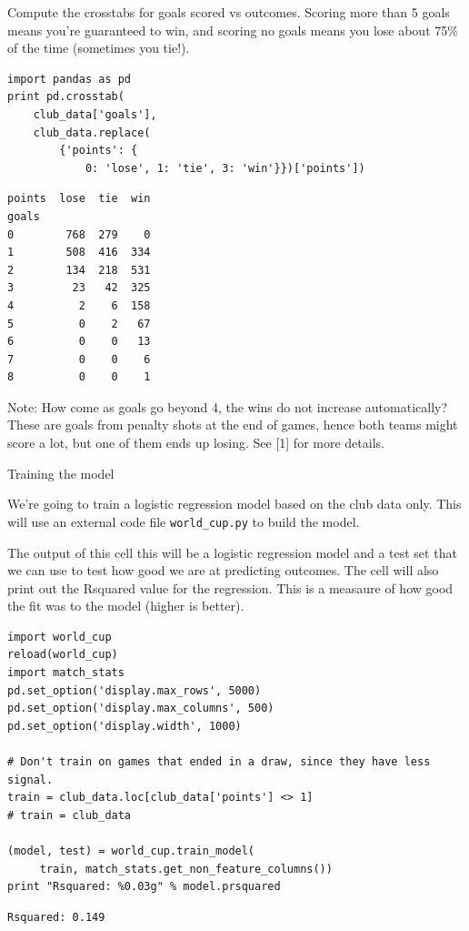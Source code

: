 \documentclass[12pt,fleqn]{article}\usepackage{common}
\begin{document}
Compute the crosstabs for goals scored vs outcomes. Scoring more than 5
goals means you're guaranteed to win, and scoring no goals means you lose
about 75\% of the time (sometimes you tie!).

\begin{verbatim}
import pandas as pd
print pd.crosstab(
    club_data['goals'], 
    club_data.replace(
        {'points': {
            0: 'lose', 1: 'tie', 3: 'win'}})['points'])
\end{verbatim}

\begin{verbatim}
points  lose  tie  win
goals                 
0        768  279    0
1        508  416  334
2        134  218  531
3         23   42  325
4          2    6  158
5          0    2   67
6          0    0   13
7          0    0    6
8          0    0    1
\end{verbatim}

Note: How come as goals go beyond 4, the wins do not increase
automatically? These are goals from penalty shots at the end of games,
hence both teams might score a lot, but one of them ends up losing. See [1]
for more details.

Training the model

We're going to train a logistic regression model based on the club data
only. This will use an external code file \verb!world_cup.py! to build the
model.

The output of this cell this will be a logistic regression model and a test
set that we can use to test how good we are at predicting outcomes. The
cell will also print out the Rsquared value for the regression. This is a
measaure of how good the fit was to the model (higher is better).

\begin{verbatim}
import world_cup
reload(world_cup)
import match_stats
pd.set_option('display.max_rows', 5000)
pd.set_option('display.max_columns', 500)
pd.set_option('display.width', 1000)

# Don't train on games that ended in a draw, since they have less signal.
train = club_data.loc[club_data['points'] <> 1] 
# train = club_data

(model, test) = world_cup.train_model(
     train, match_stats.get_non_feature_columns())
print "Rsquared: %0.03g" % model.prsquared
\end{verbatim}

\begin{verbatim}
Rsquared: 0.149
\end{verbatim}
\end{document}
